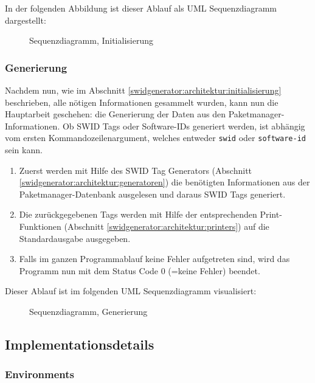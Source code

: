 In der folgenden Abbildung ist dieser Ablauf als UML Sequenzdiagramm
dargestellt:

\begin{figure}[H]
	\centering
	
	\caption{Sequenzdiagramm, Initialisierung}
\end{figure}

\subsubsection{Generierung}
\label{swidgenerator:architektur:generierung}

Nachdem nun, wie im Abschnitt \ref{swidgenerator:architektur:initialisierung}
beschrieben, alle nötigen Informationen gesammelt wurden, kann nun die
Hauptarbeit geschehen: die Generierung der Daten aus den
Paketmanager-Informationen. Ob SWID Tags oder Software-IDs generiert werden, ist
abhängig vom ersten Kommandozeilenargument, welches entweder \texttt{swid} oder
\texttt{software-id} sein kann.

\begin{enumerate}
	\item Zuerst werden mit Hilfe des SWID Tag Generators (Abschnitt
	\ref{swidgenerator:architektur:generatoren}) die benötigten Informationen aus
	der Paketmanager-Datenbank ausgelesen und daraus SWID Tags generiert.
		
	\item Die zurückgegebenen Tags werden mit Hilfe der entsprechenden
	Print-Funktionen (Abschnitt \ref{swidgenerator:architektur:printers}) auf die
	Standardausgabe ausgegeben.
		
	\item Falls im ganzen Programmablauf keine Fehler aufgetreten sind, wird das
	Programm nun mit dem Status Code 0 (=keine Fehler) beendet.
\end{enumerate}

Dieser Ablauf ist im folgenden UML Sequenzdiagramm visualisiert:

\begin{figure}[H]
	\centering
	
	\caption{Sequenzdiagramm, Generierung}
\end{figure}


\subsection{Implementationsdetails}

\subsubsection{Environments}
\label{swidgenerator:architektur:environments}

